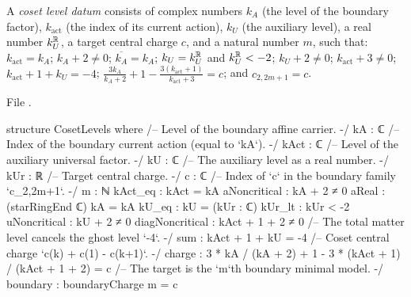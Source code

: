 \begin{definition}\label{l29:def:cosetlevels}
A \emph{coset level datum} consists of complex numbers $k_A$ (the level of the boundary factor), $k_{\mathrm{act}}$
(the index of its current action), $k_U$ (the auxiliary level), a real number $k_U^{\mathbb{R}}$, a target central charge
$c$, and a natural number $m$, such that: $k_{\mathrm{act}}=k_A$; $k_A+2\ne0$; $\overline{k_A}=k_A$;
$k_U=k_U^{\mathbb{R}}$ and $k_U^{\mathbb{R}}<-2$; $k_U+2\ne0$; $k_{\mathrm{act}}+3\ne0$; $k_{\mathrm{act}}+1+k_U=-4$;
$\frac{3k_A}{k_A+2}+1-\frac{3(k_{\mathrm{act}}+1)}{k_{\mathrm{act}}+3}=c$; and $c_{2,2m+1}=c$.
\end{definition}

\noindent File .
\begin{leancode}
structure CosetLevels where
  /-- Level of the boundary affine carrier. -/
  kA : ℂ
  /-- Index of the boundary current action (equal to `kA`). -/
  kAct : ℂ
  /-- Level of the auxiliary universal factor. -/
  kU : ℂ
  /-- The auxiliary level as a real number. -/
  kUr : ℝ
  /-- Target central charge. -/
  c : ℂ
  /-- Index of `c` in the boundary family `c_{2,2m+1}`. -/
  m : ℕ
  kAct_eq : kAct = kA
  aNoncritical : kA + 2 ≠ 0
  aReal : (starRingEnd ℂ) kA = kA
  kU_eq : kU = (kUr : ℂ)
  kUr_lt : kUr < -2
  uNoncritical : kU + 2 ≠ 0
  diagNoncritical : kAct + 1 + 2 ≠ 0
  /-- The total matter level cancels the ghost level `-4`. -/
  sum : kAct + 1 + kU = -4
  /-- Coset central charge `c(k) + c(1) - c(k+1)`. -/
  charge : 3 * kA / (kA + 2) + 1 - 3 * (kAct + 1) / (kAct + 1 + 2) = c
  /-- The target is the `m`th boundary minimal model. -/
  boundary : boundaryCharge m = c
\end{leancode}

